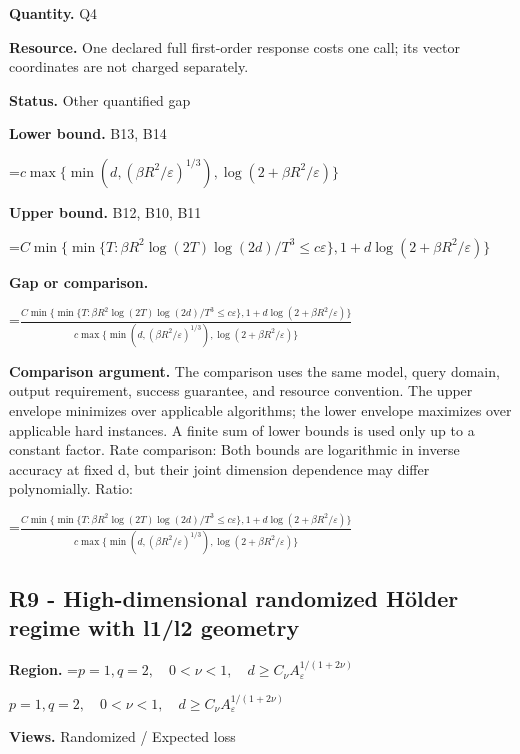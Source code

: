 \documentclass[10pt,a4paper]{article}
\newcommand{\AtlasMath}[1]{\par\begingroup\centering\setbox0=\hbox{$\displaystyle #1$}\ifdim\wd0>1.4\linewidth\typeout{ATLAS WIDE FORMULA: \the\wd0}\fi\ifdim\wd0>\linewidth\resizebox{\linewidth}{!}{\box0}\else\box0\fi\par\endgroup}
\newcommand{\AtlasInlineMath}[1]{\begingroup\setbox0=\hbox{$#1$}\ifdim\wd0>.4\linewidth\endgroup\AtlasMath{#1}\else\endgroup$#1$\fi}
\begin{document}
\textbf{Quantity.} Q4



\textbf{Resource.} One declared full first-order response costs one call; its vector coordinates are not charged separately.



\textbf{Status.} Other quantified gap



\textbf{Lower bound.} B13, B14



\AtlasMath{c\max\{\min(d,(\beta R^2/\varepsilon)^{1/3}),\log(2+\beta R^2/\varepsilon)\}}


\textbf{Upper bound.} B12, B10, B11



\AtlasMath{C\min\{\min\{T:\beta R^2\log(2T)\log(2d)/T^3\le c\varepsilon\},1+d\log(2+\beta R^2/\varepsilon)\}}


\textbf{Gap or comparison.}
\AtlasMath{\frac{C\min\{\min\{T:\beta R^2\log(2T)\log(2d)/T^3\le c\varepsilon\},1+d\log(2+\beta R^2/\varepsilon)\}}{c\max\{\min(d,(\beta R^2/\varepsilon)^{1/3}),\log(2+\beta R^2/\varepsilon)\}}}




\textbf{Comparison argument.} The comparison uses the same model, query domain, output requirement, success guarantee, and resource convention. The upper envelope minimizes over applicable algorithms; the lower envelope maximizes over applicable hard instances. A finite sum of lower bounds is used only up to a constant factor. Rate comparison: Both bounds are logarithmic in inverse accuracy at fixed d, but their joint dimension dependence may differ polynomially. Ratio:
\AtlasMath{\frac{C\min\{\min\{T:\beta R^2\log(2T)\log(2d)/T^3\le c\varepsilon\},1+d\log(2+\beta R^2/\varepsilon)\}}{c\max\{\min(d,(\beta R^2/\varepsilon)^{1/3}),\log(2+\beta R^2/\varepsilon)\}}}




\subsection{R9 - High-dimensional randomized Hölder regime with l1/l2 geometry}


\textbf{Region.} \AtlasInlineMath{p=1,q=2,\quad0<\nu<1,\quad d\ge C_\nu A_\varepsilon^{1/(1+2\nu)}}



\textbf{Views.} Randomized / Expected loss
\end{document}
